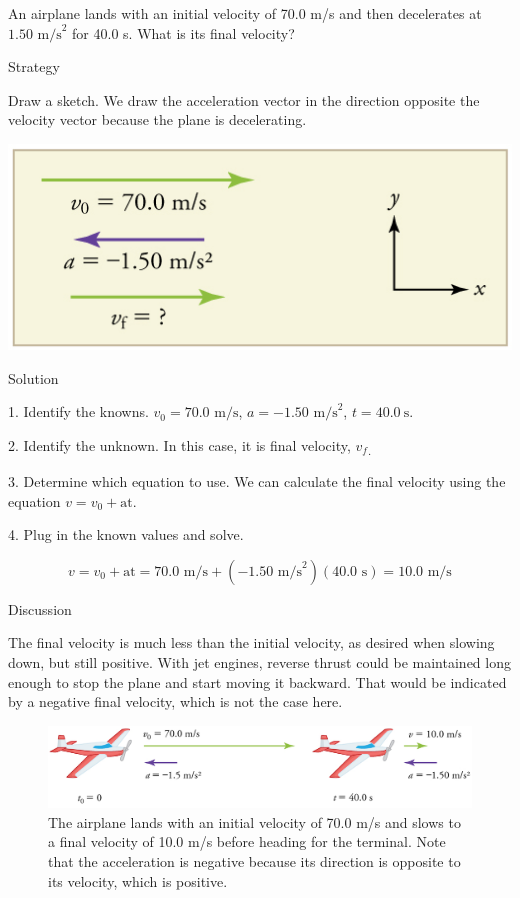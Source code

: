 \documentclass[
]{book}
\begin{document}
An airplane lands with an initial velocity of 70.0 m/s and then
decelerates at \({1\text{.}\text{50\ m/s}^{2}}{}\) for 40.0 s. What is its
final velocity?

{Strategy}

Draw a sketch. We draw the acceleration vector in the direction opposite
the velocity vector because the plane is decelerating.

\includegraphics{images/Figure_02_05_00c.jpg}

{Solution}

1. Identify the knowns. \({{v_{0} = \text{70}}\text{.}\text{0\ m/s}}{}\),
\({{a = {- 1}}\text{.}\text{50\ m/s}^{2}}{}\),
\({{t = \text{40}}\text{.}0\ \text{s}}{}\).

2. Identify the unknown. In this case, it is final velocity,
\(v_{f}{}\)\textsubscript{.}

3. Determine which equation to use. We can calculate the final velocity
using the equation \({v = {v_{0} + \text{at}}}{}\).

4. Plug in the known values and solve.

\leavevmode{}%
\[{{{v = {v_{0} + \text{at}}} = \text{70}}\text{.}{\text{0\ m/s} + \left( {{- 1}\text{.}\text{50\ m/s}^{2}} \right)}{\left( {\text{40}\text{.}\text{0\ s}} \right) = \text{10}}\text{.}\text{0\ m/s}}{}\]

{Discussion}

The final velocity is much less than the initial velocity, as desired
when slowing down, but still positive. With jet engines, reverse thrust
could be maintained long enough to stop the plane and start moving it
backward. That would be indicated by a negative final velocity, which is
not the case here.

\begin{figure}
\hypertarget{import-auto-id2173965}{%
\centering
\includegraphics{images/Figure_02_04_01.jpg}
\caption{The airplane lands with an initial velocity of 70.0 m/s and slows to a
final velocity of 10.0 m/s before heading for the terminal. Note that
the acceleration is negative because its direction is opposite to its
velocity, which is
positive.}\label{import-auto-id2173965}
}
\end{figure}
\end{document}
